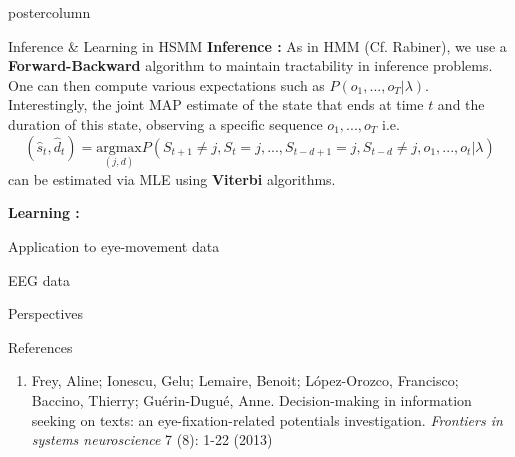 \documentclass[final,hyperref={pdfpagelabels=false}]{beamer}
\newlength{\columnheight}
\begin{document}
\begin{frame}
\begin{columns}
    \begin{column}{.49\textwidth}
      \begin{beamercolorbox}[center,wd=\textwidth]{postercolumn}
        \begin{minipage}[T]{.95\textwidth} %
          \parbox[t][\columnheight]{\textwidth}{ %
            \begin{block}{Inference \& Learning in HSMM}
                \textbf{Inference :}
                \vskip0.5cm
                As in HMM (Cf. Rabiner), we use a \textbf{Forward-Backward} algorithm to maintain tractability in inference problems.
                One can then compute various expectations such as $P(o_1, ..., o_T | \lambda)$.\\
                Interestingly, the joint MAP estimate of the state that ends at time $t$ and the duration of this state,
                observing a specific sequence $o_1, ..., o_T$ i.e.
                {\small $$(\hat s_t, \hat d_t) = \underset{(j,d)}{\mathrm{arg max}} P(S_{t+1} \neq j, S_t = j, ..., S_{t-d+1} = j, S_{t-d} \neq j, o_1, ..., o_t | \lambda)$$}
                can be estimated via MLE using \textbf{Viterbi} algorithms.

                \vskip1cm
                \textbf{Learning :}
                \vskip0.5cm

            \end{block}
            \vfill
            \begin{block}{Application to eye-movement data}
            \end{block}
            \vfill
            \begin{block}{EEG data}
            \end{block}
            \vfill
            \begin{block}{Perspectives}
            \end{block}
            \vfill
            \begin{block}{References}
                \begin{enumerate}
                    \item Frey, Aline; Ionescu, Gelu; Lemaire, Benoit; López-Orozco, Francisco; Baccino, Thierry; Guérin-Dugué, Anne.
                    Decision-making in information seeking on texts: an eye-fixation-related potentials investigation.
                    \textit{Frontiers in systems neuroscience} 7 (8): 1-22 (2013)


\end{enumerate}
\end{block}}
\end{minipage}
\end{beamercolorbox}
\end{column}
\end{columns}
\end{frame}
\end{document}
